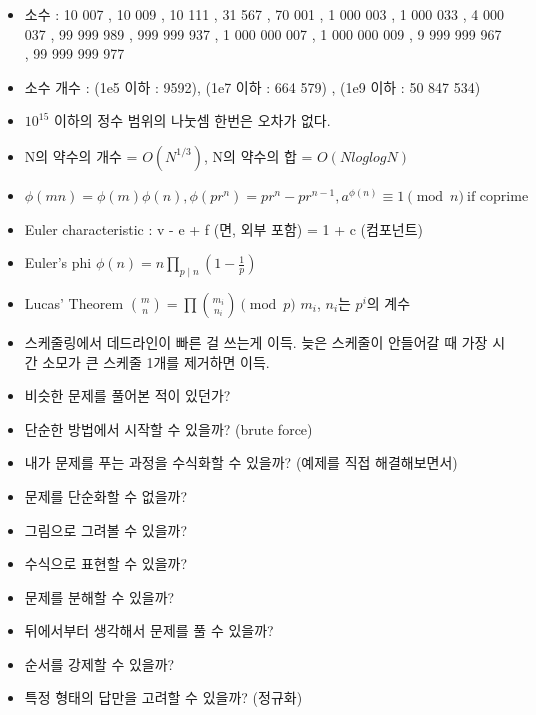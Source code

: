\documentclass[landscape, 10pt, a4paper, oneside, twocolumn]{extarticle}
\begin{document}
\begin{itemize}
    \item 소수 : 10 007 , 10 009 , 10 111 , 31 567 , 70 001 , 1 000 003 , 1 000 033 , 4 000 037 , 99 999 989 , 999 999 937 , 1 000 000 007 , 1 000 000 009 , 9 999 999 967 , 99 999 999 977
    \item 소수 개수 : (1e5 이하 : 9592), (1e7 이하 : 664 579) , (1e9 이하 : 50 847 534)
    \item $10^{15}$ 이하의 정수 범위의 나눗셈 한번은 오차가 없다.
    \item N의 약수의 개수 = $O(N^{1/3})$, N의 약수의 합 = $O(NloglogN)$
    \item $\phi(mn) = \phi(m) \phi(n) , \phi(pr^n) = pr^n - pr^{n-1} , a^{\phi(n)} \equiv 1 \pmod{n} \ \text{if coprime}$
\end{itemize}

\begin{itemize}  %
    \item Euler characteristic : v - e + f (면, 외부 포함) = 1 + c (컴포넌트)
    \item Euler's phi $\phi (n)=n\prod _{p\mid n}\left(1-{\frac {1}{p}}\right)$
    \item Lucas' Theorem $\binom{m}{n}=\prod\binom{m_i}{n_i} \pmod p$ $m_i$, $n_i$는 $p^i$의 계수
    \item 스케줄링에서 데드라인이 빠른 걸 쓰는게 이득. 늦은 스케줄이 안들어갈 때 가장 시간 소모가 큰 스케줄 1개를 제거하면 이득.
\end{itemize}


\begin{itemize}
    \item 비슷한 문제를 풀어본 적이 있던가?
    \item 단순한 방법에서 시작할 수 있을까? (brute force)
    \item 내가 문제를 푸는 과정을 수식화할 수 있을까? (예제를 직접 해결해보면서)
    \item 문제를 단순화할 수 없을까?
    \item 그림으로 그려볼 수 있을까?
    \item 수식으로 표현할 수 있을까?
    \item 문제를 분해할 수 있을까?
    \item 뒤에서부터 생각해서 문제를 풀 수 있을까?
    \item 순서를 강제할 수 있을까?
    \item 특정 형태의 답만을 고려할 수 있을까? (정규화)
\end{itemize}
\end{document}
